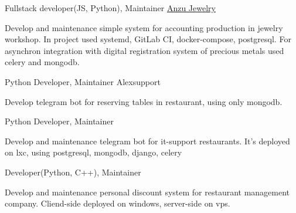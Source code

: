

\begin{cventries}

  \cventry
    {Fullstack developer(JS, Python), Maintainer}
    {\href{https://anzujewelry.com/}{Anzu Jewelry}}
    {} %
    {} %
    {
      \begin{cvitems}
        Develop and maintenance simple system for accounting production in jewelry workshop.
        In project used systemd, GitLab CI, docker-compose, postgresql.
        For asynchron integration with digital registration system of precious metals used celery and mongodb.
      \end{cvitems}
    }

  \cventry
    {Python Developer, Maintainer} %
    {Alexsupport} %
    {} %
    {} %
    {
      \begin{cvitems} %
        Develop telegram bot for reserving tables in restaurant, using only mongodb.
      \end{cvitems}
    }

  \cventry
    {Python Developer, Maintainer} %
    {} %
    {} %
    {} %
    {
      \begin{cvitems} %
        Develop and maintenance telegram bot for it-support restaurants. It's deployed on lxc,
        using postgresql, mongodb, django, celery
      \end{cvitems}
    }

  \cventry
    {Developer(Python, C++), Maintainer} %
    {} %
    {} %
    {} %
    {
      \begin{cvitems} %
        Develop and maintenance personal discount system for restaurant management company.
        Cliend-side deployed on windows, server-side on vps.
      \end{cvitems}
    }


\end{cventries}
